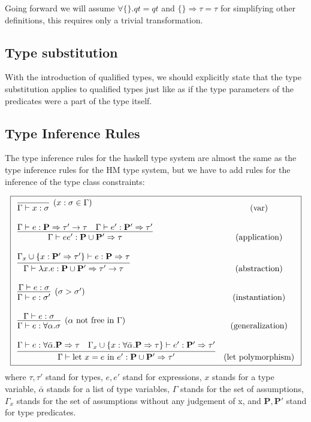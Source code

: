 Going forward we will assume $\forall \{\}. qt = qt$ and $\{\} \Rightarrow \tau = \tau$ for simplifying other definitions, this requires only a trivial transformation. %

\subsection{Type substitution}

With the introduction of qualified types, we should explicitly state that the type substitution applies to qualified types just like as if the type parameters of the predicates were a part of the type itself.

\subsection{Type Inference Rules}

The type inference rules for the haskell type system are almost the same as the type inference rules for the HM type system, but we have to add rules for the inference of the type class constraints:

\begin{defn}
    $$\boxed{\begin{array}{l c}
        \infer[(x : \sigma \in \Gamma)]{\Gamma \vdash x : \sigma}{} & (\text{var}) \\\\
        \infer{\Gamma \vdash e e' : \mathbf{P} \cup \mathbf{P'}  \Rightarrow \tau}{\Gamma \vdash e : \mathbf{P} \Rightarrow \tau' \rightarrow \tau & \Gamma \vdash e' : \mathbf{P'} \Rightarrow \tau'} & (\text{application}) \\\\
        \infer{\Gamma \vdash \lambda x . e : \mathbf{P} \cup \mathbf{P'} \Rightarrow \tau' \rightarrow \tau}{\Gamma_x \cup \{x : \mathbf{P'} \Rightarrow \tau'\} \vdash e : \mathbf{P} \Rightarrow \tau} & (\text{abstraction}) \\\\
        \infer[(\sigma > \sigma')]{\Gamma \vdash e : \sigma'}{\Gamma \vdash e : \sigma} & (\text{instantiation}) \\\\
        \infer[(\alpha \text{ not free in }\Gamma)]{\Gamma \vdash e : \forall \alpha . \sigma}{\Gamma \vdash e : \sigma} & (\text{generalization}) \\\\
        \infer{\Gamma \vdash \text{let } x = e \text{ in } e' : \mathbf{P} \cup \mathbf{P'} \Rightarrow \tau'}{\Gamma \vdash e : \forall \bar{\alpha} .  \mathbf{P} \Rightarrow \tau & \Gamma_x \cup \{x :\forall \bar{\alpha} .  \mathbf{P} \Rightarrow \tau \} \vdash e' : \mathbf{P'} \Rightarrow \tau'} & (\text{let polymorphism})
    \end{array}}$$
    where $\tau, \tau'$ stand for types, $e, e'$ stand for expressions, $x$ stands for a type variable, $\bar{\alpha}$ stands for a list of type variables, $\Gamma$ stands for the set of assumptions, $\Gamma_x$ stands for the set of assumptions without any judgement of x, and $\mathbf{P}, \mathbf{P'}$ stand for type predicates.
\end{defn}

